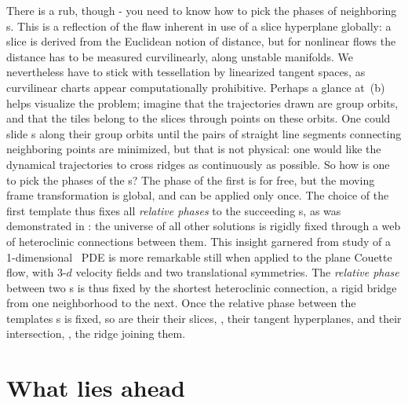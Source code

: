 \documentclass[preprint,12pt]{elsarticle} %
\begin{document}
There is a rub, though - you need to know how to pick the phases of
neighboring {\template s}. This is a reflection of the flaw inherent in use
of a slice hyperplane globally: a slice is derived from the Euclidean
notion of distance, but for nonlinear flows the distance has to be
measured curvilinearly, along unstable
manifolds. We nevertheless have to stick with
tessellation by linearized tangent spaces, as curvilinear charts appear
computationally prohibitive. Perhaps a glance at
\,(b) helps visualize the problem; imagine that the
trajectories drawn are group orbits, and that the tiles belong to the
slices through {\template} points on these orbits. One could slide
{\template s} along their group orbits until the pairs of straight line
segments connecting neighboring {\template} points are minimized, but
that is not physical: one would like the dynamical trajectories to cross
ridges as continuously as possible. So how is one to pick the phases of
the {\template s}? The phase of the first {\template} is for free, but
the moving frame transformation  is global, and can be
applied only once. The choice of the first template thus fixes all {\em
relative phases} to the succeeding {\template s}, as was demonstrated in
: the universe of all other solutions is rigidly fixed
through a web of heteroclinic connections between them. This insight
garnered from study of a 1-dimensional \KS\ PDE is more remarkable still
when applied to the plane Couette flow, with 3-$d$ velocity
fields and two translational symmetries. The {\em relative phase} between
two {\template s} is thus fixed  by the shortest heteroclinic connection,
a rigid bridge from one neighborhood to the next. Once the relative phase
between the templates {\template s} is fixed, so are their their slices,
\ie, their tangent hyperplanes, and their intersection, \ie, the  ridge
joining them.


\section{What lies ahead} %
    \label{sec:concl}
\end{document}
